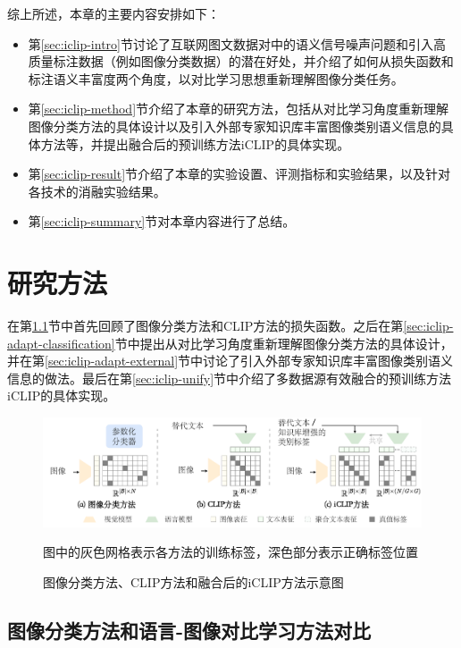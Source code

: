 综上所述，本章的主要内容安排如下：
\begin{itemize}
    \item 第\ref{sec:iclip-intro}节讨论了互联网图文数据对中的语义信号噪声问题和引入高质量标注数据（例如图像分类数据）的潜在好处，并介绍了如何从损失函数和标注语义丰富度两个角度，以对比学习思想重新理解图像分类任务。
    \item 第\ref{sec:iclip-method}节介绍了本章的研究方法，包括从对比学习角度重新理解图像分类方法的具体设计以及引入外部专家知识库丰富图像类别语义信息的具体方法等，并提出融合后的预训练方法iCLIP的具体实现。
    \item 第\ref{sec:iclip-result}节介绍了本章的实验设置、评测指标和实验结果，以及针对各技术的消融实验结果。
    \item 第\ref{sec:iclip-summary}节对本章内容进行了总结。
\end{itemize}

\section{研究方法}
在第\ref{sec:iclip-compare}节中首先回顾了图像分类方法和CLIP方法的损失函数。之后在第\ref{sec:iclip-adapt-classification}节中提出从对比学习角度重新理解图像分类方法的具体设计，并在第\ref{sec:iclip-adapt-external}节中讨论了引入外部专家知识库丰富图像类别语义信息的做法。最后在第\ref{sec:iclip-unify}节中介绍了多数据源有效融合的预训练方法iCLIP的具体实现。

\label{sec:iclip-method}
\begin{figure}
  \centering
  \includegraphics[width=1.0\linewidth]{figures/iclip-compare.pdf}
  \caption*{图中的灰色网格表示各方法的训练标签，深色部分表示正确标签位置}
  \caption{图像分类方法、CLIP方法和融合后的iCLIP方法示意图}
  \label{fig:iclip-compare}
\end{figure}
\subsection{图像分类方法和语言-图像对比学习方法对比}
\label{sec:iclip-compare}
